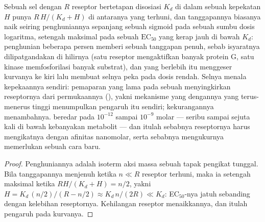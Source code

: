 \begin{proposition}\label{prop:b3:endocrinology:dose}
Sebuah sel dengan $R$ reseptor bertetapan disosiasi $K_{d}$ di dalam sebuah
kepekatan  $H$ punya $R\,H/(K_{d} + H)$ di antaranya yang terhuni, dan
tanggapannya biasanya naik seiring penghuniannya sepanjang sebuah sigmoid pada sebuah
sumbu dosis logaritma, setengah maksimal pada sebuah $\text{EC}_{50}$ yang
kerap jauh di bawah $K_{d}$: penghunian beberapa persen memberi sebuah tanggapan
penuh, sebab isyaratnya dilipatgandakan di hilirnya (satu reseptor
mengaktifkan banyak protein G, satu kinase memfosforilasi banyak
substrat), dan \emph{} yang berlebih itu menggeser kurvanya
ke kiri lalu membuat selnya peka pada dosis rendah. Selnya menala
kepekaannya sendiri: pemaparan yang lama pada sebuah  menyingkirkan
reseptornya dari permukaannya (\emph{}), yakni mekanisme yang
dengannya  yang terus-menerus tinggi menumpulkan pengaruh  itu sendiri;
kekurangannya menambahnya.  beredar pada $10^{-12}$ sampai
$10^{-9}$ molar --- seribu sampai sejuta kali di bawah kebanyakan
metabolit --- dan itulah sebabnya reseptornya harus mengikatnya dengan
afinitas nanomolar, serta sebabnya mengukurnya memerlukan sebuah cara baru.
\end{proposition}
\begin{proof}
Penghuniannya adalah isoterm aksi massa sebuah tapak pengikat tunggal. Bila
tanggapannya menjenuh ketika $n \ll R$ reseptor terhuni, maka ia
setengah maksimal ketika $R H/(K_{d} + H) = n/2$, yakni $H = K_{d}\,
(n/2)/(R - n/2) \approx K_{d}\, n/(2R) \ll K_{d}$: EC$_{50}$-nya jatuh
sebanding dengan kelebihan reseptornya. Kehilangan reseptor menaikkannya,
dan itulah pengaruh  pada kurvanya.
\end{proof}

